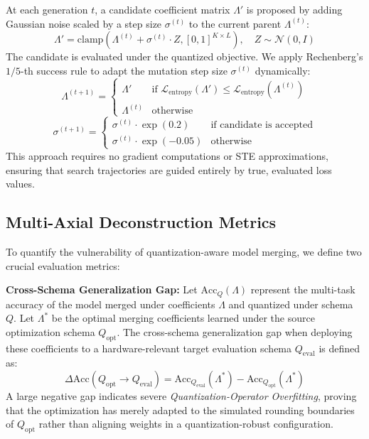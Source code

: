 At each generation $t$, a candidate coefficient matrix $\Lambda'$ is proposed by adding Gaussian noise scaled by a step size $\sigma^{(t)}$ to the current parent $\Lambda^{(t)}$:
\begin{equation}
    \Lambda' = \text{clamp}\left(\Lambda^{(t)} + \sigma^{(t)} \cdot Z, [0, 1]^{K \times L}\right), \quad Z \sim \mathcal{N}(0, I)
\end{equation}
The candidate is evaluated under the quantized objective. We apply Rechenberg's $1/5$-th success rule to adapt the mutation step size $\sigma^{(t)}$ dynamically:
\begin{equation}
    \Lambda^{(t+1)} = \begin{cases}
        \Lambda' & \text{if } \mathcal{L}_{\text{entropy}}(\Lambda') \le \mathcal{L}_{\text{entropy}}(\Lambda^{(t)}) \\
        \Lambda^{(t)} & \text{otherwise}
    \end{cases}
\end{equation}
\begin{equation}
    \sigma^{(t+1)} = \begin{cases}
        \sigma^{(t)} \cdot \exp(0.2) & \text{if candidate is accepted} \\
        \sigma^{(t)} \cdot \exp(-0.05) & \text{otherwise}
    \end{cases}
\end{equation}
This approach requires no gradient computations or STE approximations, ensuring that search trajectories are guided entirely by true, evaluated loss values.

\subsection{Multi-Axial Deconstruction Metrics}
To quantify the vulnerability of quantization-aware model merging, we define two crucial evaluation metrics:

\textbf{Cross-Schema Generalization Gap:} Let $\text{Acc}_Q(\Lambda)$ represent the multi-task accuracy of the model merged under coefficients $\Lambda$ and quantized under schema $Q$. Let $\Lambda^*$ be the optimal merging coefficients learned under the source optimization schema $Q_{\text{opt}}$. The cross-schema generalization gap when deploying these coefficients to a hardware-relevant target evaluation schema $Q_{\text{eval}}$ is defined as:
\begin{equation}
    \Delta \text{Acc}(Q_{\text{opt}} \to Q_{\text{eval}}) = \text{Acc}_{Q_{\text{eval}}}(\Lambda^*) - \text{Acc}_{Q_{\text{opt}}}(\Lambda^*)
\end{equation}
A large negative gap indicates severe \emph{Quantization-Operator Overfitting}, proving that the optimization has merely adapted to the simulated rounding boundaries of $Q_{\text{opt}}$ rather than aligning weights in a quantization-robust configuration.

